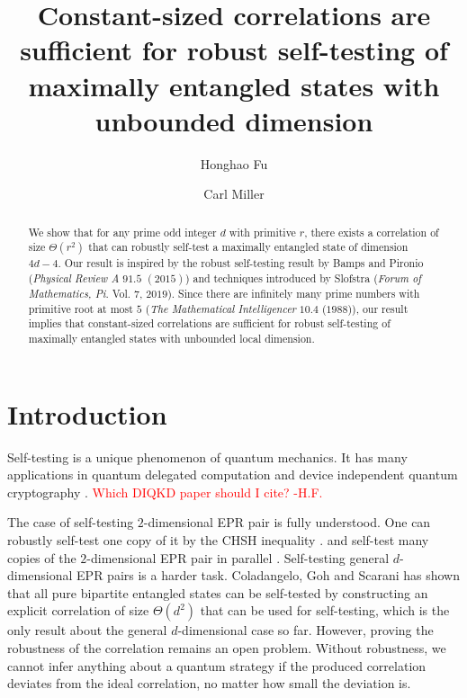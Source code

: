 \documentclass[11pt,letterpaper]{article}
\newcommand{\1}{\mathbb{1}}
\newcommand{\hfc}[1]{\textcolor{red}{#1 -H.F.}}
\theoremstyle{definition}
\begin{document}
\title{Constant-sized correlations are sufficient for 
robust self-testing of maximally entangled states with unbounded dimension}

\author[1]{Honghao Fu}
\author[1,2]{Carl Miller}

\renewcommand\Affilfont{\itshape\small}



\maketitle

\begin{abstract}
	We show that for any prime odd integer $d$ with primitive $r$, there exists a correlation of size
	$\Theta(r^2)$ 
	that can robustly self-test a maximally entangled state of dimension $4d-4$. Our result is
	inspired by the robust self-testing result by Bamps and Pironio (\textit{Physical Review A} $91.5$ $(2015)$) and
	techniques introduced by Slofstra (\textit{Forum of Mathematics, Pi}. Vol. $7$, $2019$). Since there are
	infinitely many prime numbers with primitive root at most $5$ (\textit{The Mathematical Intelligencer} $10.4$ ($1988$)), 
	our result implies that constant-sized correlations are sufficient for robust self-testing of maximally entangled states
	with unbounded local dimension.
\end{abstract}
\section{Introduction}
\label{sec:intro}
Self-testing is a unique phenomenon of quantum mechanics. It has many applications in quantum
delegated computation \cite{ruv2013,coladan2017verifier} and device independent quantum cryptography
\cite{miller2017,fu2018,eat2018}.
\hfc{Which DIQKD paper should I cite?}

The case of self-testing $2$-dimensional EPR pair is fully understood. One can robustly self-test
one copy of it by the CHSH inequality \cite{bamps2015}. and self-test many copies of the $2$-dimensional EPR
pair in parallel \cite{mckague2016, coladan2016parallel, lowdegree}. 
Self-testing general $d$-dimensional EPR pairs is a harder task.
Coladangelo, Goh and Scarani has shown that all pure bipartite entangled states can be self-tested \cite{coladan2017all}
by constructing an explicit correlation of size $\Theta(d^2)$ that can be used for self-testing,
which is the only result about the general $d$-dimensional case so far.
However, proving the robustness of the correlation remains an open problem. 
Without robustness, we cannot infer anything about a quantum strategy if
the produced correlation deviates from the ideal correlation, no matter how small the 
deviation is. 
 
\end{document}
